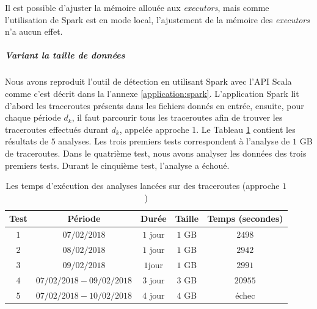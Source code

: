 Il est possible  d'ajuster   la mémoire allouée aux \textit{executors}, mais comme l'utilisation de Spark est en mode local, l'ajustement de la mémoire des \textit{executors} n'a aucun effet. 


\subparagraph{Variant la taille de données}

Nous avons reproduit l'outil de détection en utilisant Spark avec l'API Scala comme c'est décrit dans la l'annexe \ref{application:spark}. L'application Spark lit d'abord les traceroutes présents dans les fichiers donnés en entrée, ensuite, pour chaque période $d_k$, il faut parcourir tous les  traceroutes afin de trouver les traceroutes effectués durant $d_k$, appelée approche 1.  Le Tableau \ref{tab:spark-timing} contient les résultats de $5$ analyses. Les trois premiers tests correspondent à l'analyse de $1$ GB de traceroutes. Dans le quatrième test, nous avons analyser les données des trois premiers tests. Durant le cinquième test, l'analyse a échoué. 

\begin{table}[H]
\centering
\captionsetup{justification=centering}
	\begin{tabular}{c cccc}
		
		\textbf{Test}&\textbf{Période} &\textbf{Durée}  & \textbf{Taille}   & \textbf{Temps (secondes)} \\ \hline
		
		$ 1 $&$ 07/02/2018 $&$ 1 $ jour&$ 1 $ GB& $ 2498 $\\ \hline
		$ 2 $&$ 08/02/2018 $&$ 1 $ jour&$ 1 $ GB& $ 2942 $\\ \hline
	$ 	3 $&$ 09/02/2018 $&$ 1  $jour& $ 1 $ GB& $ 2991 $\\ \hline
		$ 4 $&$ 07/02/2018 - 09/02/2018 $&$ 3 $ jour& $ 3 $ GB& $ 20955 $\\ \hline
		$ 5 $&$ 07/02/2018 - 10/02/2018 $&$ 4 $ jour& $ 4 $ GB & échec \\ \hline
	\end{tabular}
	\caption{Les temps d'exécution des analyses lancées sur des traceroutes (approche $1$)}
	\label{tab:spark-timing}
\end{table}

